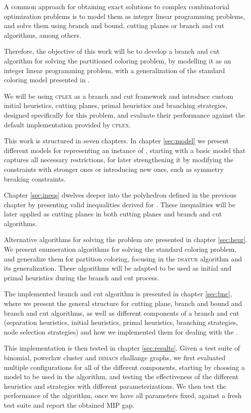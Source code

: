 A common approach for obtaining exact solutions to complex combinatorial optimization problems is to model them as integer linear programming problems, and solve them using branch and bound, cutting planes or branch and cut algorithms, among others. 

Therefore, the objective of this work will be to develop a branch and cut algorithm for solving the partitioned coloring problem, by modelling it as an integer linear programming problem, with a generalization of the standard coloring model presented in \cite{mendez2006branch,mendez2008cutting}. 

We will be using \textsc{cplex} as a branch and cut framework and introduce custom initial heuristics, cutting planes, primal heuristics and branching strategies, designed specifically for this problem, and evaluate their performance against the default implementation provided by \textsc{cplex}.

This work is structured in seven chapters. In chapter \ref{sec:model} we present different models for representing an instance of \PCP{}, starting with a basic model that captures all necessary restrictions, for later strengthening it by modifying the constraints with stronger ones or introducing new ones, such as symmetry breaking constraints.

Chapter \ref{sec:ineqs} dwelves deeper into the polyhedron defined in the previous chapter by presenting valid inequalities derived for \PCP{}. These inequalities will be later applied as cutting planes in both cutting planes and branch and cut algorithms.

Alternative algorithms for solving the problem are presented in chapter \ref{sec:heur}. We present enumeration algorithms for solving the standard coloring problem, and generalize them for partition coloring, focusing in the \textsc{dsatur} algorithm \cite{brelaz1979new} and its generalization. These algorithms will be adapted to be used as initial and primal heuristics during the branch and cut process.

The implemented branch and cut algorithm is presented in chapter \ref{sec:bnc}, where we present the general structure for cutting plane, branch and bound and branch and cut algorithms, as well as different components of a branch and cut (separation heuristics, initial heuristics, primal heuristics, branching strategies, node selection strategies) and how we implemented them for dealing with the \PCP{}.

This implementation is then tested in chapter \ref{sec:results}. Given a test suite of binomial, powerlaw cluster and \textsc{dimacs} challange graphs, we first evaluated multiple configurations for all of the different components, starting by choosing a model to be used in the algorithm, and testing the effectiveness of the different heuristics and strategies with different parameterizations. We then test the performance of the algorithm, once we have all parameters fixed, against a fresh test suite and report the obtained MIP gap.

